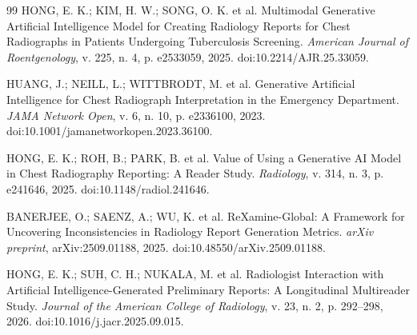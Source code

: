 \documentclass[12pt,a4paper]{article}
\begin{document}
\begin{singlespace}
\begin{thebibliography}{99}
 HONG, E. K.; KIM, H. W.; SONG, O. K. et al. Multimodal Generative Artificial Intelligence Model for Creating Radiology Reports for Chest Radiographs in Patients Undergoing Tuberculosis Screening. \textit{American Journal of Roentgenology}, v. 225, n. 4, p. e2533059, 2025. doi:10.2214/AJR.25.33059.

 HUANG, J.; NEILL, L.; WITTBRODT, M. et al. Generative Artificial Intelligence for Chest Radiograph Interpretation in the Emergency Department. \textit{JAMA Network Open}, v. 6, n. 10, p. e2336100, 2023. doi:10.1001/jamanetworkopen.2023.36100.

 HONG, E. K.; ROH, B.; PARK, B. et al. Value of Using a Generative AI Model in Chest Radiography Reporting: A Reader Study. \textit{Radiology}, v. 314, n. 3, p. e241646, 2025. doi:10.1148/radiol.241646.

 BANERJEE, O.; SAENZ, A.; WU, K. et al. ReXamine-Global: A Framework for Uncovering Inconsistencies in Radiology Report Generation Metrics. \textit{arXiv preprint}, arXiv:2509.01188, 2025. doi:10.48550/arXiv.2509.01188.

 HONG, E. K.; SUH, C. H.; NUKALA, M. et al. Radiologist Interaction with Artificial Intelligence-Generated Preliminary Reports: A Longitudinal Multireader Study. \textit{Journal of the American College of Radiology}, v. 23, n. 2, p. 292--298, 2026. doi:10.1016/j.jacr.2025.09.015.
\end{thebibliography}
\end{singlespace}
\end{document}
